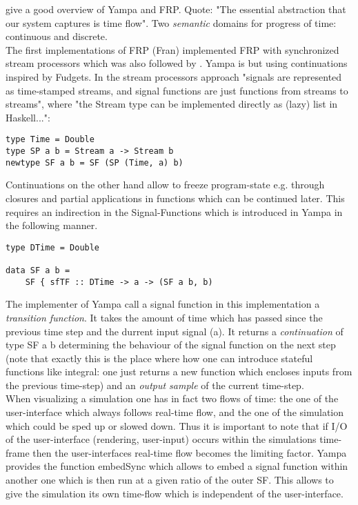 \cite{Nilsson2002} give a good overview of Yampa and FRP. Quote: "The essential abstraction that our system captures is time flow". Two \textit{semantic} domains for progress of time: continuous and discrete. \\

The first implementations of FRP (Fran) implemented FRP with synchronized stream processors which was also followed by \cite{Wan2000}. Yampa is but using continuations inspired by Fudgets. In the stream processors approach "signals are represented as time-stamped streams, and signal functions are just functions from streams to streams", where "the Stream type can be implemented directly as (lazy) list in Haskell...":
\begin{lstlisting}[frame=single]
type Time = Double
type SP a b = Stream a -> Stream b
newtype SF a b = SF (SP (Time, a) b)
\end{lstlisting}
Continuations on the other hand allow to freeze program-state e.g. through closures and partial applications in functions which can be continued later. This requires an indirection in the Signal-Functions which is introduced in Yampa in the following manner. 
\begin{lstlisting}[frame=single]
type DTime = Double

data SF a b = 
	SF { sfTF :: DTime -> a -> (SF a b, b)
\end{lstlisting}
The implementer of Yampa call a signal function in this implementation a \textit{transition function}. It takes the amount of time which has passed since the previous time step and the durrent input signal (a). It returns a \textit{continuation} of type SF a b determining the behaviour of the signal function on the next step (note that exactly this is the place where how one can introduce stateful functions like integral: one just returns a new function which encloses inputs from the previous time-step) and an \textit{output sample} of the current time-step. \\

When visualizing a simulation one has in fact two flows of time: the one of the user-interface which always follows real-time flow, and the one of the simulation which could be sped up or slowed down. Thus it is important to note that if I/O of the user-interface (rendering, user-input) occurs within the simulations time-frame then the user-interfaces real-time flow becomes the limiting factor. Yampa provides the function embedSync which allows to embed a signal function within another one which is then run at a given ratio of the outer SF. This allows to give the simulation its own time-flow which is independent of the user-interface. \\


